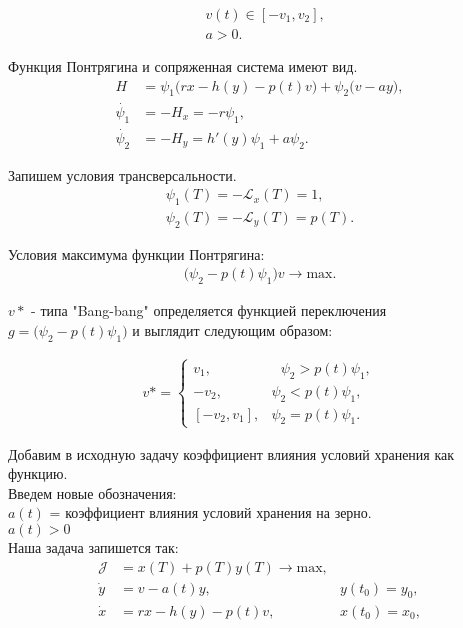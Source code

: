 {\begin{align*}
    & v(t) \in [-v_{1}, v_{2}], \\
    & a > 0.
\end{align*}

Функция Понтрягина и сопряженная система имеют вид. 
\begin{align}
    {H} & = \psi_{1} \big( r x- h(y) - p(t) v \big) + \psi_{2} \big( v - a y \big),\\
    \Dot{\psi_{1}} & = -H_x = -r \psi_{1},\\
    \Dot{\psi_{2}} & = -H_y = h'(y) \psi_{1} +  a \psi_{2}.
\end{align} 

Запишем  условия трансверсальности.
\begin{align}
    {\psi_{1}(T)} = \mathcal{- L}_x(T)= 1,\\
    {\psi_{2}(T)} = \mathcal {- L}_y(T)= p(T).
\end{align} 


Условия максимума функции Понтрягина:
\begin{align}
     \big (\psi_{2} - p(t)\psi_{1} \big )v \to \mathrm{max}.
\end{align}


${v*}$ - типа "Bang-bang" определяется функцией переключения\\
$g = \big (\psi_{2} - p(t)\psi_{1} \big)$ и выглядит следующим образом:

\begin{align}
v* = 
 \begin{cases}
   v_{1}, &\text{ $\psi_{2} > p(t)\psi_{1}$},\\
   -v_{2}, &\text{$\psi_{2} < p(t)\psi_{1}$},\\
   [-v_{2},v_{1}], &\text{$\psi_{2} = p(t)\psi_{1}$}.
 \end{cases}
\end{align}






Добавим в исходную задачу коэффициент влияния условий хранения как функцию.\\
Введем новые обозначения:\\
${a(t)}$ = коэффициент влияния условий хранения на зерно.\\
$a(t) > 0$\\
 Наша задача запишется так:\\

\begin{align}
\mathcal{J} & = x(T) + p(T) y(T) \to \mathrm{max},\\
    \Dot{y} & = v - a(t) y, & y(t_{0}) = y_{0}, \\
    \Dot{x} & = r x - h(y) - p(t) v, & x(t_{0}) = x_{0}, 
\end{align}

}
